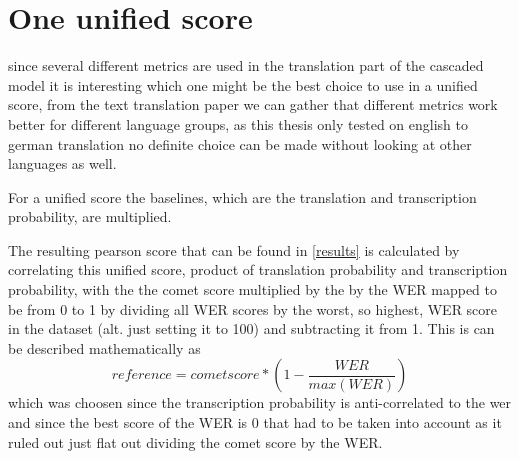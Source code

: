 \section{One unified score}
since several different metrics are used in the translation part of the cascaded model it is interesting which one might be the best choice to use in a unified score, from the text translation paper \cite{fomicheva2020unsupervised} we can gather that different metrics work better for different language groups, as this thesis only tested on english to german translation no definite choice can be made without looking at other languages as well.

For a unified score the baselines, which are the translation and transcription probability, are multiplied. 

The resulting pearson score that can be found in \autoref{results} is calculated by correlating this unified score, product of translation probability and transcription probability, with the the comet score multiplied by the by the WER mapped to be from 0 to 1 by dividing all WER scores by the worst, so highest, WER score in the dataset (alt. just setting it to 100) and subtracting it from 1. 
This is can be described mathematically as 
$$reference = cometscore*(1-\frac{WER}{max(WER)})$$
which was choosen since the transcription probability is anti-correlated to the wer and since the best score of the WER is 0 that had to be taken into account as it ruled out just flat out dividing the comet score by the WER.

